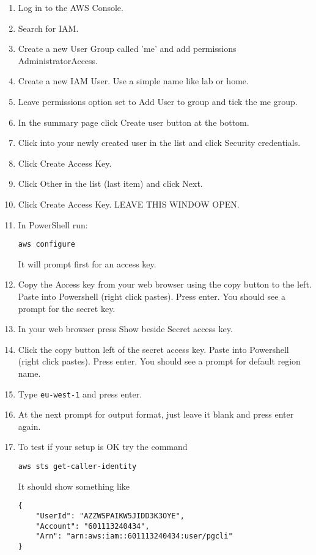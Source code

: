 \begin{enumerate}
\item Log in to the AWS Console.
\item Search for IAM.
\item Create a new User Group called 'me' and add permissions AdministratorAccess. 
\item Create a new IAM User.  Use a simple name like lab or home.
\item Leave permissions option set to Add User to group and tick the me group.
\item In the summary page click Create user button at the bottom.
\item Click into your newly created user in the list and click Security credentials.
\item Click Create Access Key.
\item Click Other in the list (last item) and click Next.
\item Click Create Access Key. LEAVE THIS WINDOW OPEN. 
\item In PowerShell run:
\begin{verbatim}
aws configure
\end{verbatim}
It will prompt first for an access key. 
\item Copy the Access key from your web browser using the copy button to the left. Paste into Powershell (right click pastes). Press enter. You should see a prompt for the secret key.
\item In your web browser press Show beside Secret access key.
\item Click the copy button left of the secret access key. Paste into Powershell (right click pastes). Press enter. You should see a prompt for default region name.
\item Type \texttt{eu-west-1} and press enter.
\item At the next prompt for output format, just leave it blank and press enter again.
\item To test if your setup is OK try the command
\begin{verbatim}
aws sts get-caller-identity
\end{verbatim}
It should show something like
\begin{verbatim}
{
    "UserId": "AZZWSPAIKW5JIDD3K3OYE",
    "Account": "601113240434",
    "Arn": "arn:aws:iam::601113240434:user/pgcli"
}
\end{verbatim}
\end{enumerate}





